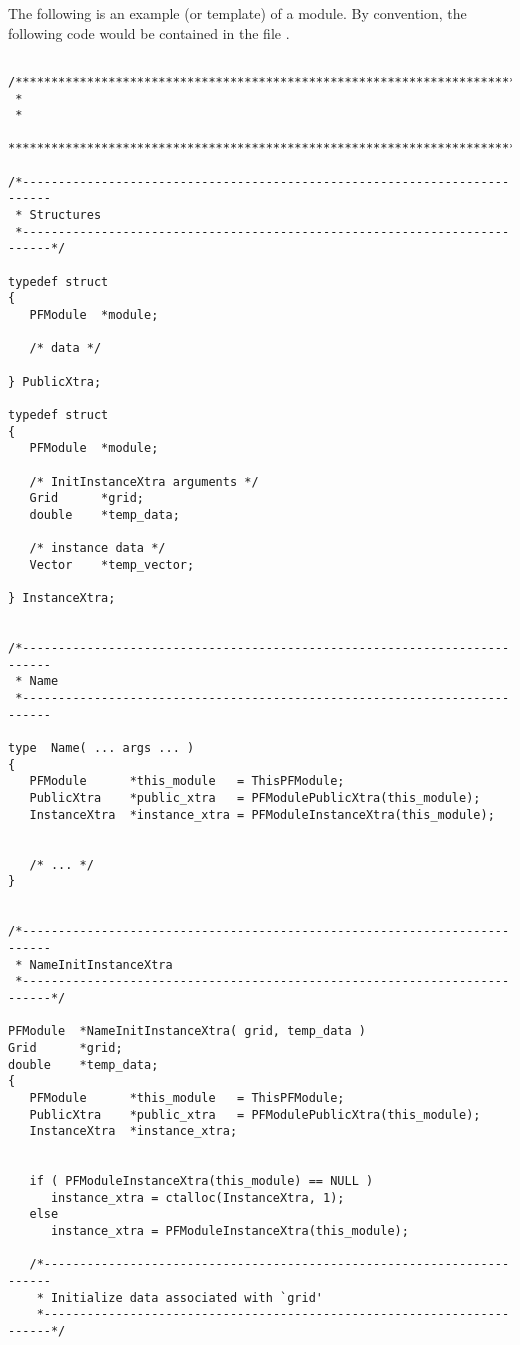 The following is an example (or template) of a \parflow{} module.
By convention, the following code would be contained in the file
.

\begin{verbatim}

/******************************************************************************
 *
 *
 *****************************************************************************/

/*--------------------------------------------------------------------------
 * Structures
 *--------------------------------------------------------------------------*/

typedef struct
{
   PFModule  *module;

   /* data */

} PublicXtra;

typedef struct
{
   PFModule  *module;

   /* InitInstanceXtra arguments */
   Grid      *grid;
   double    *temp_data;

   /* instance data */
   Vector    *temp_vector;

} InstanceXtra;


/*--------------------------------------------------------------------------
 * Name
 *--------------------------------------------------------------------------

type  Name( ... args ... )
{
   PFModule      *this_module   = ThisPFModule;
   PublicXtra    *public_xtra   = PFModulePublicXtra(this_module);
   InstanceXtra  *instance_xtra = PFModuleInstanceXtra(this_module);


   /* ... */
}


/*--------------------------------------------------------------------------
 * NameInitInstanceXtra
 *--------------------------------------------------------------------------*/

PFModule  *NameInitInstanceXtra( grid, temp_data )
Grid      *grid;
double    *temp_data;
{
   PFModule      *this_module   = ThisPFModule;
   PublicXtra    *public_xtra   = PFModulePublicXtra(this_module);
   InstanceXtra  *instance_xtra;


   if ( PFModuleInstanceXtra(this_module) == NULL )
      instance_xtra = ctalloc(InstanceXtra, 1);
   else
      instance_xtra = PFModuleInstanceXtra(this_module);

   /*-----------------------------------------------------------------------
    * Initialize data associated with `grid'
    *-----------------------------------------------------------------------*/


\end{verbatim}

